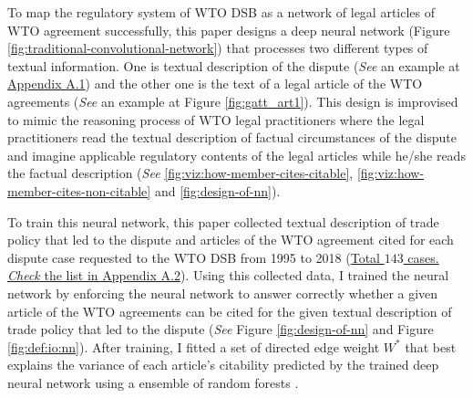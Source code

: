 To map the regulatory system of WTO DSB as 
a network of legal articles of WTO agreement 
successfully,
this paper designs a deep neural network (Figure \ref{fig:traditional-convolutional-network}) that
processes two different types of textual information.
One is textual description of the dispute (\textit{See} an example at \hyperref[sub:factual-aspect-example]{Appendix A.1}) and
the other one is the text of a legal article of the WTO agreements (\textit{See} an example at Figure \ref{fig:gatt_art1}).
This design is improvised to mimic
the reasoning process of WTO legal practitioners
where the legal practitioners read
the textual description of
factual circumstances of the dispute and imagine applicable regulatory contents of
the legal articles while he/she reads the factual description (\textit{See} \ref{fig:viz:how-member-cites-citable}, \ref{fig:viz:how-member-cites-non-citable} and \ref{fig:design-of-nn}).


To train this neural network, this paper collected textual description of trade policy 
that led to the dispute and articles of the WTO agreement cited for each dispute
case requested to the WTO DSB 
from 1995 to 2018 (\hyperref[sub:cited-articles-table]{Total $143$ cases. \textit{Check} the list in Appendix A.2}).
Using this collected data, I trained the neural network by enforcing the neural network to answer correctly 
whether a given article of the WTO agreements
can be cited for the given textual description of 
trade policy that led to the dispute (\textit{See} Figure \ref{fig:design-of-nn} and Figure \ref{fig:def:io:nn}).
After training, I fitted a set of directed edge weight $W^*$ that 
best explains the variance of each article's citability predicted by the trained deep neural network using a ensemble of random forests \citep{genie3}. 


